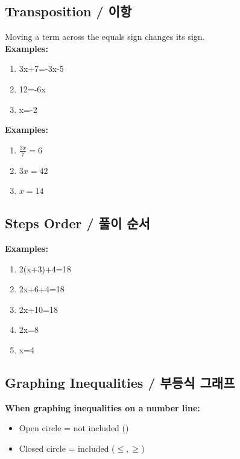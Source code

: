 \blockquote{}

\newpage
\subsection{Transposition / 이항}
Moving a term across the equals sign changes its sign. \\

\textbf{Examples:}
\begin{enumerate}
    \item 3x+7=-3x-5 \quad
    \item 12=-6x \quad
    \item x=-2
\end{enumerate}

\blockquote{}

\textbf{Examples:}
\begin{enumerate}
    \item $\frac{3x}{7} = 6$
    \item $3x = 42$
    \item $x = 14$
\end{enumerate}


\newpage
\subsection{Steps Order / 풀이 순서}
\blockquote{}

\textbf{Examples:}
\begin{enumerate}
    \item 2(x+3)+4=18 \quad
    \item 2x+6+4=18
    \item 2x+10=18 
    \item 2x=8 
    \item x=4
\end{enumerate}

\newpage
\subsection{Graphing Inequalities / 부등식 그래프}
\textbf{When graphing inequalities on a number line:}
\begin{itemize}
    \item Open circle = not included (\(<, >\))  
    \item Closed circle = included (\(\leq, \geq\))  
\end{itemize}

